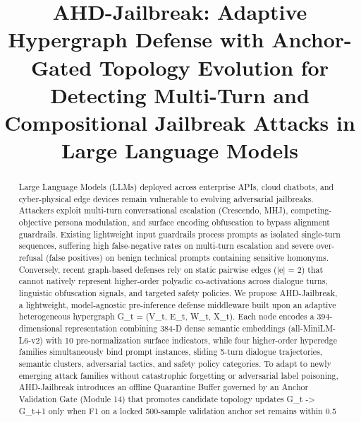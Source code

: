 \documentclass[10pt,twocolumn]{article}
\title{\Large\textbf{AHD-Jailbreak: Adaptive Hypergraph Defense with Anchor-Gated Topology Evolution for Detecting Multi-Turn and Compositional Jailbreak Attacks in Large Language Models}}
\author{
  \textbf{Sesetti Pavan Kumar Swamy}$^{1}$, \textbf{Rajana Rajeswari}$^{2}$, and \textbf{Mrs. S. Suguna Sri}$^{3}\\[4pt]
  \small $^{1}$Dept. of CSE (24555A0519 (CSE–C)), Godavari Global University\\
  \small $^{2}$Dept. of CSE (23551A05C9 (CSE–B)), Godavari Global University\\
  \small $^{3}$Faculty Guide & Assistant Professor, Dept. of CSE, Godavari Global University, Rajamahendravaram, AP, India
}
\date{}
\begin{document}
\maketitle

\begin{abstract}
Large Language Models (LLMs) deployed across enterprise APIs, cloud chatbots, and cyber-physical edge devices remain vulnerable to evolving adversarial jailbreaks. Attackers exploit multi-turn conversational escalation (Crescendo, MHJ), competing-objective persona modulation, and surface encoding obfuscation to bypass alignment guardrails. Existing lightweight input guardrails process prompts as isolated single-turn sequences, suffering high false-negative rates on multi-turn escalation and severe over-refusal (false positives) on benign technical prompts containing sensitive homonyms. Conversely, recent graph-based defenses rely on static pairwise edges (|e| = 2) that cannot natively represent higher-order polyadic co-activations across dialogue turns, linguistic obfuscation signals, and targeted safety policies. We propose AHD-Jailbreak, a lightweight, model-agnostic pre-inference defense middleware built upon an adaptive heterogeneous hypergraph G_t = (V_t, E_t, W_t, X_t). Each node encodes a 394-dimensional representation combining 384-D dense semantic embeddings (all-MiniLM-L6-v2) with 10 pre-normalization surface indicators, while four higher-order hyperedge families simultaneously bind prompt instances, sliding 5-turn dialogue trajectories, semantic clusters, adversarial tactics, and safety policy categories. To adapt to newly emerging attack families without catastrophic forgetting or adversarial label poisoning, AHD-Jailbreak introduces an offline Quarantine Buffer governed by an Anchor Validation Gate (Module 14) that promotes candidate topology updates G_t -> G_{t+1} only when F1 on a locked 500-sample validation anchor set remains within 0.5%
\end{abstract}
\end{document}
